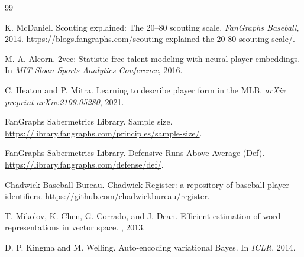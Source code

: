 \documentclass[10pt,twocolumn,letterpaper]{article}
\begin{document}
\begin{thebibliography}{99}

K. McDaniel.
\newblock Scouting explained: The 20--80 scouting scale.
\newblock \emph{FanGraphs Baseball}, 2014. \url{https://blogs.fangraphs.com/scouting-explained-the-20-80-scouting-scale/}.

M. A. Alcorn.
\newblock 2vec: Statistic-free talent modeling with neural player embeddings.
\newblock In \emph{MIT Sloan Sports Analytics Conference}, 2016.

C. Heaton and P. Mitra.
\newblock Learning to describe player form in the MLB.
\newblock \emph{arXiv preprint arXiv:2109.05280}, 2021.

FanGraphs Sabermetrics Library.
\newblock Sample size.
\newblock \url{https://library.fangraphs.com/principles/sample-size/}.

FanGraphs Sabermetrics Library.
\newblock Defensive Runs Above Average (Def).
\newblock \url{https://library.fangraphs.com/defense/def/}.

Chadwick Baseball Bureau.
\newblock Chadwick Register: a repository of baseball player identifiers.
\newblock \url{https://github.com/chadwickbureau/register}.

T. Mikolov, K. Chen, G. Corrado, and J. Dean.
\newblock Efficient estimation of word representations in vector space.
, 2013.

D. P. Kingma and M. Welling.
\newblock Auto-encoding variational Bayes.
\newblock In {\em ICLR}, 2014.

\end{thebibliography}
\end{document}
